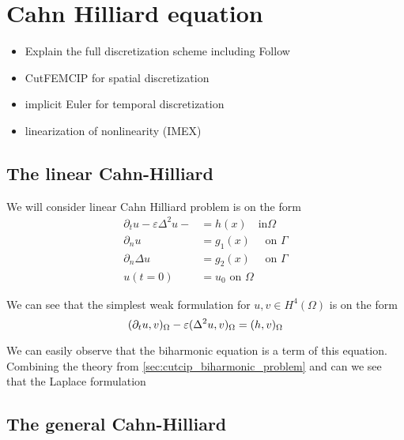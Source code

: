 
\newpage
\section{Cahn Hilliard equation }%
\label{sec:cahn_hilliard_equation}


\begin{itemize}
    \item Explain the full discretization scheme including Follow \cite{feng2007fully}
    \item CutFEMCIP for spatial discretization
    \item implicit Euler for temporal discretization
    \item linearization of nonlinearity (IMEX)
\end{itemize}


\subsection{The linear Cahn-Hilliard}%
\label{sub:the_problem}

We will consider linear Cahn Hilliard problem is on the form
\begin{equation}
\label{eq:ch_exact}
    \begin{split}
        \partial _{t} u  - \varepsilon \Delta^2   u -   & =  h(x)  \quad \text{in} \Omega \\
        \partial _{n} u & =  g_{1}(x)  \quad \text{ on } \Gamma \\
        \partial _{n} \Delta u & = g_{2}(x)  \quad \text{ on } \Gamma  \\
        u(t=0) & = u_{0}   \text{ on } \Omega
    \end{split}
\end{equation}


We can see that the simplest weak formulation for $u,v \in H^{4}( \Omega ) $ is on the form
\[
( \partial _{t}u, v )_{\Omega }  - \varepsilon ( \Delta^2 u, v)_{\Omega } = ( h,v)_{\Omega }   \\
\]



We can easily observe that the biharmonic equation is a term of this equation. Combining the theory from \ref{sec:cutcip_biharmonic_problem} and can we see that the Laplace formulation



\subsection{The general Cahn-Hilliard}%
\label{sub:the_problem}

